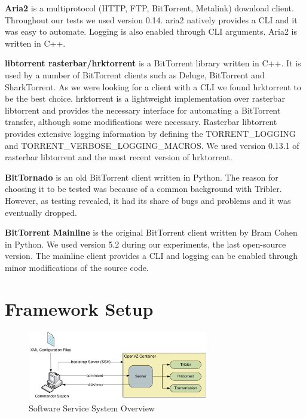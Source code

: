 \textbf{Aria2} is a multiprotocol (HTTP, FTP, BitTorrent, Metalink) download
client. Throughout our tests we used version 0.14. aria2 natively provides a
CLI and it was easy to automate. Logging is also enabled through CLI
arguments. Aria2 is written in C++.

\textbf{libtorrent rasterbar/hrktorrent} is a BitTorrent library written in
C++. It is used by a number of BitTorrent clients such as Deluge, BitTorrent
and SharkTorrent. As we were looking for a client with a CLI we found
hrktorrent to be the best choice. hrktorrent is a lightweight implementation
over rasterbar libtorrent and provides the necessary interface for automating
a BitTorrent transfer, although some modifications were necessary. Rasterbar
libtorrent provides extensive logging information by defining the
TORRENT\_LOGGING and TORRENT\_VERBOSE\_LOGGING\_MACROS. We used version 0.13.1
of rasterbar libtorrent and the most recent version of hrktorrent.

\textbf{BitTornado} is an old BitTorrent client written in Python. The reason
for choosing it to be tested was because of a common background with Tribler.
However, as testing revealed, it had its share of bugs and problems and it was
eventually dropped.

\textbf{BitTorrent Mainline} is the original BitTorrent client written by Bram
Cohen in Python. We used version 5.2 during our experiments, the last
open-source version. The mainline client provides a CLI and logging can be
enabled through minor modifications of the source code.

\section{Framework Setup}
\label{sec:deploy-fwork}

\begin{figure}[h]
  \begin{center}
    \includegraphics[width=0.7\textwidth]{src/img/virt-infra/service-arch}
  \end{center}
  \caption{Software Service System Overview}
  \label{fig:virt-infra:service-arch}
\end{figure}

